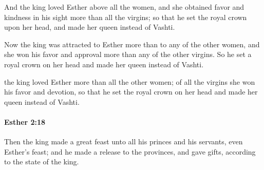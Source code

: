 			\begin{versebox}
					\item[BHS] 
					\item[LXX] 
					\item[ASV] And the king loved Esther above all the women, and she obtained favor and kindness in his sight more than all the virgins; so that he set the royal crown upon her head, and made her queen instead of Vashti.
					\item[NIV] Now the king was attracted to Esther more than to any of the other women, and she won his favor and approval more than any of the other virgins. So he set a royal crown on her head and made her queen instead of Vashti.
					\item[NRSV] the king loved Esther more than all the other women; of all the virgins she won his favor and devotion, so that he set the royal crown on her head and made her queen instead of Vashti.
			\end{versebox}

		\paragraph{Esther 2:18} %
			\label{ESTHER-2-18}

			Then the king made a great feast unto all his princes and his servants, even Esther’s feast; and he made a release to the provinces, and gave gifts, according to the state of the king.

